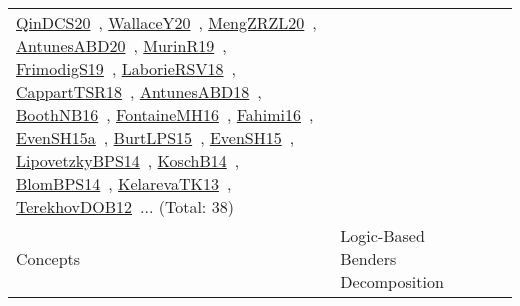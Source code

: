 {\begin{longtable}{lp{3cm}>{\raggedright\arraybackslash}p{6cm}>{\raggedright\arraybackslash}p{6cm}>{\raggedright\arraybackslash}p{8cm}}
\href{../works/QinDCS20.pdf}{QinDCS20}~\cite{QinDCS20}, \href{../works/WallaceY20.pdf}{WallaceY20}~\cite{WallaceY20}, \href{../works/MengZRZL20.pdf}{MengZRZL20}~\cite{MengZRZL20}, \href{../works/AntunesABD20.pdf}{AntunesABD20}~\cite{AntunesABD20}, \href{../works/MurinR19.pdf}{MurinR19}~\cite{MurinR19}, \href{../works/FrimodigS19.pdf}{FrimodigS19}~\cite{FrimodigS19}, \href{../works/LaborieRSV18.pdf}{LaborieRSV18}~\cite{LaborieRSV18}, \href{../works/CappartTSR18.pdf}{CappartTSR18}~\cite{CappartTSR18}, \href{../works/AntunesABD18.pdf}{AntunesABD18}~\cite{AntunesABD18}, \href{../works/BoothNB16.pdf}{BoothNB16}~\cite{BoothNB16}, \href{../works/FontaineMH16.pdf}{FontaineMH16}~\cite{FontaineMH16}, \href{../works/Fahimi16.pdf}{Fahimi16}~\cite{Fahimi16}, \href{../works/EvenSH15a.pdf}{EvenSH15a}~\cite{EvenSH15a}, \href{../works/BurtLPS15.pdf}{BurtLPS15}~\cite{BurtLPS15}, \href{../works/EvenSH15.pdf}{EvenSH15}~\cite{EvenSH15}, \href{../works/LipovetzkyBPS14.pdf}{LipovetzkyBPS14}~\cite{LipovetzkyBPS14}, \href{../works/KoschB14.pdf}{KoschB14}~\cite{KoschB14}, \href{../works/BlomBPS14.pdf}{BlomBPS14}~\cite{BlomBPS14}, \href{../works/KelarevaTK13.pdf}{KelarevaTK13}~\cite{KelarevaTK13}, \href{../works/TerekhovDOB12.pdf}{TerekhovDOB12}~\cite{TerekhovDOB12}... (Total: 38)\\
Concepts & Logic-Based Benders Decomposition &  &  & \\

\end{longtable}}
